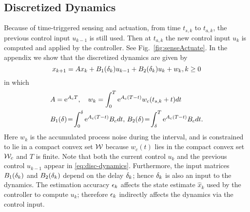 \subsection{Discretized Dynamics}
Because of time-triggered sensing and actuation, from time $t_{s,k}$ to $t_{a,k}$, the  previous control input $u_{k-1}$
is still used.
Then at $t_{a,k}$ the new control input $u_{k}$
is computed and applied by the controller. 
See Fig.~\ref{fig:senseActuate}.
In the appendix we show that the discretized dynamics are given by 
\begin{equation}
\label{eq:disc-dynamics}
x_{k+1}=Ax_{k}+B_{1}(\delta_k)u_{k-1}+B_{2}(\delta_k)u_{k}+w_{k}, k\geq0
\end{equation}
in which
\begin{eqnarray*}
&A=\eu^{A_{c}T}, \quad
w_{k}%
=\int_{0}^{T}\eu^{A_{c}(T-t)}w_{c}(t_{s,k}+t) dt 
\\
&B_{1}(\sDelay)%
\!=\!\int_{0}^{\sDelay}\eu^{A_{c}(T-t)}B_{c} dt,\,
B_{2}(\sDelay)%
\!=\!\int_{\sDelay}^{T}\eu^{A_{c}(T-t)}B_{c} dt \text.
\end{eqnarray*}
Here $w_{k}$ is the accumulated process noise during the interval, and is constrained to lie in a compact convex set $\mathcal{W}$ because $w_c(t)$ lies in the compact convex set $\mathcal{W}_c$ and $T$ is finite.
Note that both the current control $u_{k}$ and the previous
control $u_{k-1}$ appear in \eqref{eq:disc-dynamics}.
Furthermore, the input matrices $B_{1}(\delta_k)$ and $B_{2}(\delta_k)$
depend on the delay $\delta_k$; hence $\delta_k$ is also an
input to the dynamics. 
The estimation accuracy $\epsilon_k$ affects the state estimate
$\hat{x}_{k}$ %
used by the controller to compute $u_{k}$;
therefore $\epsilon_k$ indirectly affects the dynamics via the control
input.







